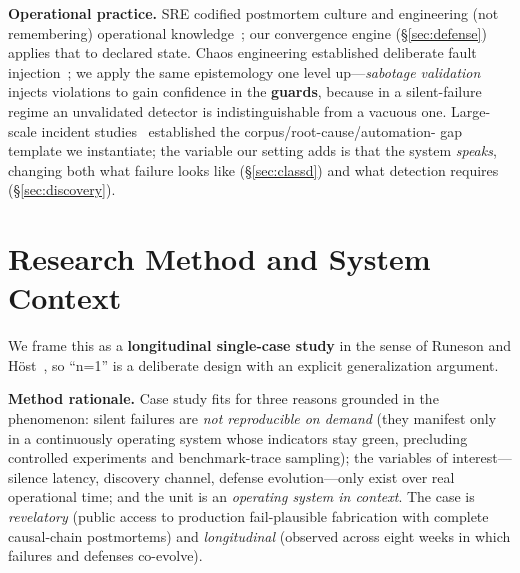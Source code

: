 \documentclass[conference]{IEEEtran}
\begin{document}
\textbf{Operational practice.} SRE codified postmortem culture and
engineering (not remembering) operational knowledge~\cite{beyer2016sre};
our convergence engine (\S\ref{sec:defense}) applies that to declared
state. Chaos engineering established deliberate fault
injection~\cite{basiri2016chaos}; we apply the same epistemology one level
up---\emph{sabotage validation} injects violations to gain confidence in
the \textbf{guards}, because in a silent-failure regime an unvalidated
detector is indistinguishable from a vacuous one. Large-scale incident
studies~\cite{ghosh2022fight} established the corpus/root-cause/automation-%
gap template we instantiate; the variable our setting adds is that the
system \emph{speaks}, changing both what failure looks like
(\S\ref{sec:classd}) and what detection requires (\S\ref{sec:discovery}).

\section{Research Method and System Context}\label{sec:method}
We frame this as a \textbf{longitudinal single-case study} in the sense of
Runeson and H\"ost~\cite{runeson2009case}, so ``n=1'' is a deliberate
design with an explicit generalization argument.

\textbf{Method rationale.} Case study fits for three reasons grounded in
the phenomenon: silent failures are \emph{not reproducible on demand}
(they manifest only in a continuously operating system whose indicators
stay green, precluding controlled experiments and benchmark-trace
sampling); the variables of interest---silence latency, discovery channel,
defense evolution---only exist over real operational time; and the unit is
an \emph{operating system in context}. The case is \emph{revelatory}
(public access to production fail-plausible fabrication with complete
causal-chain postmortems) and \emph{longitudinal} (observed across eight
weeks in which failures and defenses co-evolve).
\end{document}
